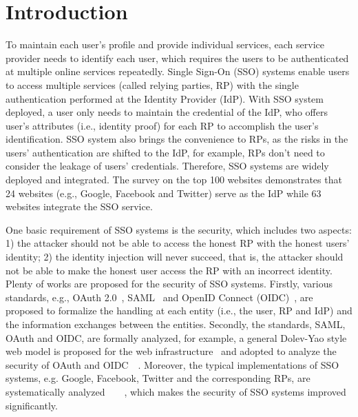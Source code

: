 \section{Introduction}
\label{sec:intro}


To maintain each user's profile and provide individual services, each service provider needs to identify each user, which requires the users to be authenticated at multiple online services repeatedly. 
Single Sign-On (SSO) systems enable users to access multiple services (called relying parties, RP) with the single authentication performed at the Identity Provider (IdP). With SSO system deployed, a user only needs to maintain the credential of the IdP, who offers user's attributes (i.e., identity proof) for each RP to accomplish the user's identification. 
SSO system also brings the convenience to RPs, as the risks in the users' authentication are shifted to the IdP, for example, RPs don't need to consider the leakage of users' credentials. 
Therefore, SSO systems are widely deployed and integrated. 
The survey on the top 100 websites demonstrates that 24 websites (e.g., Google, Facebook and Twitter) serve as the IdP while 63 websites integrate the SSO service.  



One basic requirement of SSO systems is the security, which includes two aspects: 1) the attacker should not be able to access the honest RP with the honest users' identity; 2) the identity injection will never succeed, that is, the attacker should not be able to make the honest user access the RP with an incorrect identity. Plenty of works are proposed for the security of SSO systems. 
Firstly, various standards, e.g., OAuth 2.0~\cite{rfc6749}, SAML~\cite{SAML} and OpenID Connect (OIDC)~\cite{OpenIDConnect}, are proposed to formalize the handling at each entity (i.e.,  the user, RP and IdP)  and the information exchanges between the entities. 
Secondly, the standards, SAML, OAuth and OIDC, are formally analyzed, for example, a general Dolev-Yao style web model is proposed for the web infrastructure~\cite{webmodel} and adopted to analyze the security of OAuth and OIDC~\cite{FettKS16}~\cite{FettKS17}.
Moreover, the typical implementations of SSO systems, e.g. Google, Facebook, Twitter and the corresponding RPs, are systematically analyzed~\cite{WangCW12}~\cite{FettKS16}~\cite{ZhouE14}~\cite{WangZLG16}, which makes  the security of SSO systems improved significantly.


